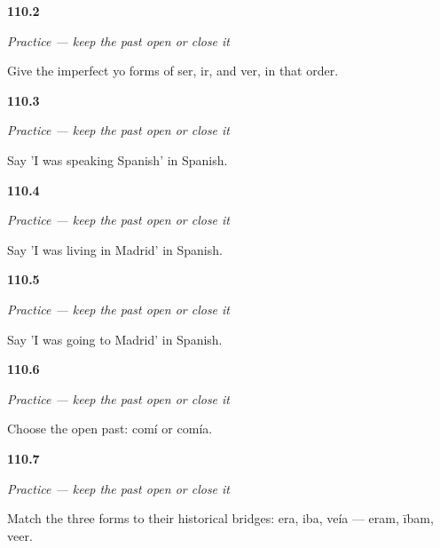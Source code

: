 \noindent\begin{minipage}[t]{\linewidth}
\raggedright
\hypertarget{review-ES-C16-practice-short-yo-forms}{\textbf{110.2}} \emph{Practice — keep the past open or close it}\par
\small Give the imperfect yo forms of ser, ir, and ver, in that order.
\end{minipage}\par\medskip

\noindent\begin{minipage}[t]{\linewidth}
\raggedright
\hypertarget{review-ES-C16-practice-hablaba-espanol}{\textbf{110.3}} \emph{Practice — keep the past open or close it}\par
\small Say 'I was speaking Spanish' in Spanish.
\end{minipage}\par\medskip

\noindent\begin{minipage}[t]{\linewidth}
\raggedright
\hypertarget{review-ES-C16-practice-vivia-madrid}{\textbf{110.4}} \emph{Practice — keep the past open or close it}\par
\small Say 'I was living in Madrid' in Spanish.
\end{minipage}\par\medskip

\noindent\begin{minipage}[t]{\linewidth}
\raggedright
\hypertarget{review-ES-C16-practice-iba-madrid}{\textbf{110.5}} \emph{Practice — keep the past open or close it}\par
\small Say 'I was going to Madrid' in Spanish.
\end{minipage}\par\medskip

\noindent\begin{minipage}[t]{\linewidth}
\raggedright
\hypertarget{review-ES-C16-practice-comi-comia}{\textbf{110.6}} \emph{Practice — keep the past open or close it}\par
\small Choose the open past: comí or comía.
\end{minipage}\par\medskip

\noindent\begin{minipage}[t]{\linewidth}
\raggedright
\hypertarget{review-ES-C16-practice-history-match}{\textbf{110.7}} \emph{Practice — keep the past open or close it}\par
\small Match the three forms to their historical bridges: era, iba, veía — eram, ībam, veer.
\end{minipage}\par\medskip

